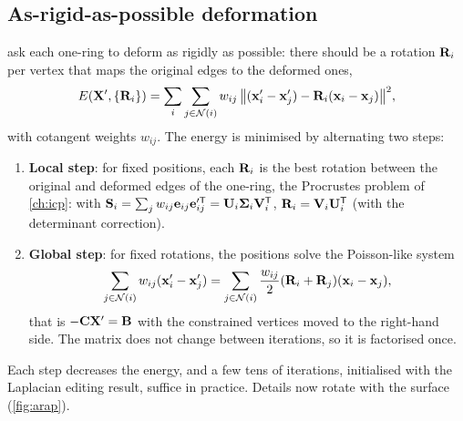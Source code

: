 \subsection{As-rigid-as-possible deformation}

\citet{Sorkine2007} ask each one-ring to deform as rigidly as possible: there should be a rotation
$\mathbf{R}_i$ per vertex that maps the original edges to the deformed ones,
\begin{equation}
E(\mathbf{X}',\{\mathbf{R}_i\})=\sum_i\sum_{j\in\mathcal N(i)}w_{ij}\,\bigl\|(\mathbf{x}'_i-\mathbf{x}'_j)-\mathbf{R}_i(\mathbf{x}_i-\mathbf{x}_j)\bigr\|^2 ,
\end{equation}
with cotangent weights $w_{ij}$. The energy is minimised by alternating two steps:
\begin{enumerate}
  \item \textbf{Local step}: for fixed positions, each $\mathbf{R}_i$ is the best rotation between the
  original and deformed edges of the one-ring, the Procrustes problem of \cref{ch:icp}: with
  $\mathbf{S}_i=\sum_jw_{ij}\mathbf{e}_{ij}\mathbf{e}_{ij}'^{\mathsf T}=\mathbf{U}_i\boldsymbol{\Sigma}_i\mathbf{V}_i^{\mathsf{T}}$,
  $\mathbf{R}_i=\mathbf{V}_i\mathbf{U}_i^{\mathsf{T}}$ (with the determinant correction).
  \item \textbf{Global step}: for fixed rotations, the positions solve the Poisson-like system
  \begin{equation}
  \sum_{j\in\mathcal N(i)}w_{ij}(\mathbf{x}'_i-\mathbf{x}'_j)=\sum_{j\in\mathcal N(i)}\frac{w_{ij}}{2}(\mathbf{R}_i+\mathbf{R}_j)(\mathbf{x}_i-\mathbf{x}_j),
  \end{equation}
  that is $-\mathbf{C}\mathbf{X}'=\mathbf B$ with the constrained vertices moved to the right-hand side. The matrix
  does not change between iterations, so it is factorised once.
\end{enumerate}
Each step decreases the energy, and a few tens of iterations, initialised with the Laplacian editing
result, suffice in practice. Details now rotate with the surface (\cref{fig:arap}).


